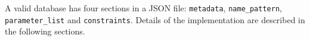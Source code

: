 A valid \chaplin database has four sections in a JSON file: \texttt{\small metadata}, \texttt{\small name\_pattern}, \texttt{\small parameter\_list} and \texttt{\small constraints}. Details of the implementation are described in the following sections.
